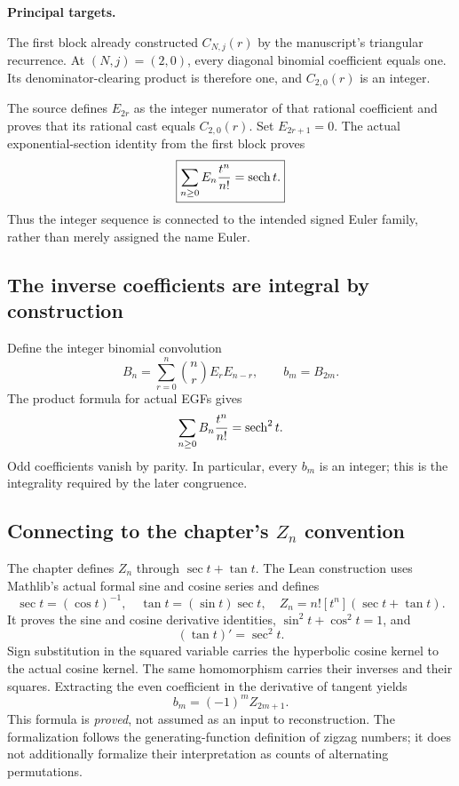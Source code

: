 \textbf{Principal targets.}\par
{}\par
{}\par
{}
\par\medskip
{}
The first block already constructed $C_{N,j}(r)$ by the manuscript's triangular recurrence. At $(N,j)=(2,0)$, every diagonal binomial coefficient equals one. Its denominator-clearing product is therefore one, and $C_{2,0}(r)$ is an integer.

The source defines $E_{2r}$ as the integer numerator of that rational coefficient and proves that its rational cast equals $C_{2,0}(r)$. Set $E_{2r+1}=0$. The actual exponential-section identity from the first block proves
\[
 \boxed{\sum_{n\ge0}E_n\frac{t^n}{n!}=\operatorname{sech} t.}
\]
Thus the integer sequence is connected to the intended signed Euler family, rather than merely assigned the name Euler.

\subsection*{The inverse coefficients are integral by construction}
Define the integer binomial convolution
\[
 B_n=\sum_{r=0}^{n}\binom nr E_rE_{n-r},\qquad b_m=B_{2m}.
\]
The product formula for actual EGFs gives
\[
 \sum_{n\ge0}B_n\frac{t^n}{n!}=\operatorname{sech}^2 t.
\]
Odd coefficients vanish by parity. In particular, every $b_m$ is an integer; this is the integrality required by the later congruence.

\subsection*{Connecting to the chapter's $Z_n$ convention}
The chapter defines $Z_n$ through $\sec t+\tan t$. The Lean construction uses Mathlib's actual formal sine and cosine series and defines
\[
 \sec t=(\cos t)^{-1},\quad \tan t=(\sin t)\sec t,
 \quad Z_n=n![t^n](\sec t+\tan t).
\]
It proves the sine and cosine derivative identities, $\sin^2t+\cos^2t=1$, and
\[
 (\tan t)'=\sec^2t.
\]
Sign substitution in the squared variable carries the hyperbolic cosine kernel to the actual cosine kernel. The same homomorphism carries their inverses and their squares. Extracting the even coefficient in the derivative of tangent yields
\[
 \boxed{b_m=(-1)^m Z_{2m+1}.}
\]
This formula is \emph{proved}, not assumed as an input to reconstruction. The formalization follows the generating-function definition of zigzag numbers; it does not additionally formalize their interpretation as counts of alternating permutations.

